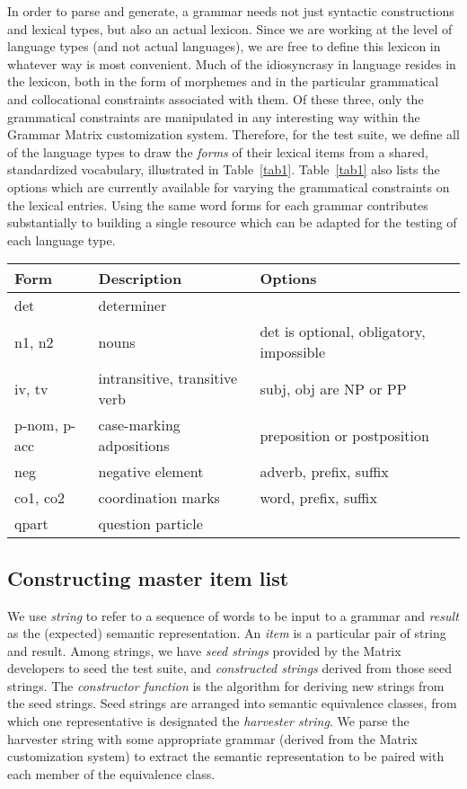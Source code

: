 \documentclass[11pt]{article}
\begin{document}
In order to parse and generate, a grammar needs not just syntactic
constructions and lexical types, but also an actual lexicon.  Since we
are working at the level of language types (and not actual languages),
we are free to define this lexicon in whatever way is most convenient.
Much of the idiosyncrasy in language resides in the lexicon, both in
the form of morphemes and in the particular grammatical and
collocational constraints associated with them.  Of these three, only
the grammatical constraints are manipulated in any interesting way
within the Grammar Matrix customization system.  Therefore, for the
test suite, we define all of the language types to draw the {\it
forms} of their lexical items from a shared, standardized vocabulary,
illustrated in Table~\ref{tab1}.  Table~\ref{tab1} also lists the
options which are currently available for varying the grammatical
constraints on the lexical entries.  Using the same word forms for
each grammar contributes substantially to building a single resource
which can be adapted for the testing of each language type.

\begin{table*}[ht]
\begin{center}
\begin{tabular}{|l|l|l|}
\hline
Form & Description & Options \\ \hline \hline
det & determiner & \\ 
n1, n2 & nouns & det is optional, obligatory, impossible\\
iv, tv & intransitive, transitive verb & subj, obj are NP or PP\\
p-nom, p-acc & case-marking adpositions & preposition or postposition\\
neg & negative element & adverb, prefix, suffix\\
co1, co2 & coordination marks & word, prefix, suffix\\
qpart & question particle & \\
\hline
\end{tabular}
\end{center}
\caption{Standardized lexicon}
\label{tab1}
\end{table*}


\subsection{Constructing master item list}

We use {\it string} to refer to a sequence of words to be input to a
grammar and {\it result} as the (expected) semantic representation.
An {\it item} is a particular pair of string and result.  Among
strings, we have {\it seed strings} provided by the Matrix developers
to seed the test suite, and {\it constructed strings} derived from
those seed strings.  The {\it constructor function} is the algorithm
for deriving new strings from the seed strings. Seed strings are
arranged into semantic equivalence classes, from which one
representative is designated the {\it harvester string}.  We parse the
harvester string with some appropriate grammar (derived from the
Matrix customization system) to extract the semantic representation to
be paired with each member of the equivalence class.
\end{document}
